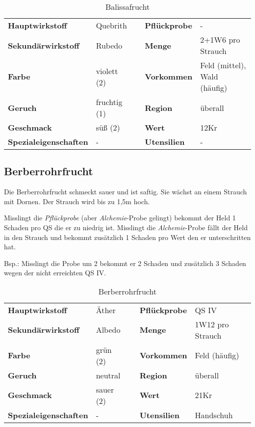\begin{table}[H]
\begin{center}
\begin{tabular}{|l|l|p{1cm}|l|l|}
	\cline{1-2} \cline{4-5}
	\textbf{Hauptwirkstoff} & Quebrith && \textbf{Pflückprobe} & - \\ \cline{1-2} \cline{4-5}
	\textbf{Sekundärwirkstoff} & Rubedo && \textbf{Menge} & 2+1W6 pro Strauch \\ \cline{1-2} \cline{4-5}
	\textbf{Farbe} & violett (2) && \textbf{Vorkommen} & Feld (mittel), Wald (häufig) \\ \cline{1-2} \cline{4-5}
	\textbf{Geruch} & fruchtig (1) && \textbf{Region} & überall \\ \cline{1-2} \cline{4-5}
	\textbf{Geschmack} & süß (2) && \textbf{Wert} & 12Kr \\ \cline{1-2} \cline{4-5}
	\textbf{Spezialeigenschaften} & - && \textbf{Utensilien} & - \\ \cline{1-2} \cline{4-5}
\end{tabular}
\end{center}
\caption{Balissafrucht}
\label{tab:balissafrucht}
\end{table}


\subsection{Berberrohrfrucht}
Die Berberrohrfrucht schmeckt sauer und ist saftig. Sie wächst an einem Strauch mit Dornen. Der Strauch wird bis zu 1,5m hoch. 

Misslingt die \textit{Pflückprobe} (aber \textit{Alchemie}-Probe gelingt) bekommt der Held 1 Schaden pro QS die er zu niedrig ist. Misslingt die \textit{Alchemie}-Probe fällt der Held in den Strauch und bekommt zusätzlich 1 Schaden pro Wert den er unterschritten hat. 

Bsp.: Misslingt die Probe um 2 bekommt er 2 Schaden und zusätzlich 3 Schaden wegen der nicht erreichten QS IV.

\begin{table}[H]
\begin{center}
\begin{tabular}{|l|l|p{1cm}|l|l|}
	\cline{1-2} \cline{4-5}
	\textbf{Hauptwirkstoff} & Äther && \textbf{Pflückprobe} & QS IV \\ \cline{1-2} \cline{4-5}
	\textbf{Sekundärwirkstoff} & Albedo && \textbf{Menge} & 1W12 pro Strauch \\ \cline{1-2} \cline{4-5}
	\textbf{Farbe} & grün (2) && \textbf{Vorkommen} & Feld (häufig) \\ \cline{1-2} \cline{4-5}
	\textbf{Geruch} & neutral && \textbf{Region} & überall \\ \cline{1-2} \cline{4-5}
	\textbf{Geschmack} & sauer (2) && \textbf{Wert} & 21Kr \\ \cline{1-2} \cline{4-5}
	\textbf{Spezialeigenschaften} & - && \textbf{Utensilien} & Handschuh \\ \cline{1-2} \cline{4-5}
\end{tabular}
\end{center}
\caption{Berberrohrfrucht}
\label{tab:berberrohrfrucht}
\end{table}


